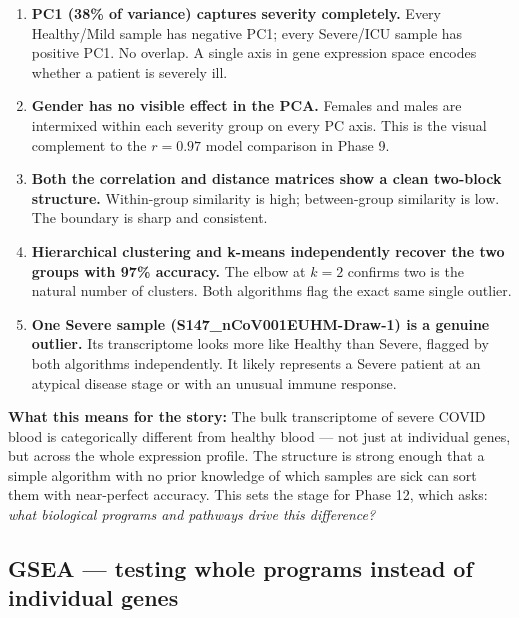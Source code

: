 \documentclass[11pt, a4paper]{article}
\begin{document}
\begin{enumerate}[nosep]
  \item \textbf{PC1 (38\% of variance) captures severity completely.}
        Every Healthy/Mild sample has negative PC1; every Severe/ICU sample has
        positive PC1. No overlap. A single axis in gene expression space encodes
        whether a patient is severely ill.

  \item \textbf{Gender has no visible effect in the PCA.}
        Females and males are intermixed within each severity group on every PC axis.
        This is the visual complement to the $r = 0.97$ model comparison in Phase 9.

  \item \textbf{Both the correlation and distance matrices show a clean two-block
        structure.} Within-group similarity is high; between-group similarity is low.
        The boundary is sharp and consistent.

  \item \textbf{Hierarchical clustering and k-means independently recover the two
        groups with 97\% accuracy.}
        The elbow at $k = 2$ confirms two is the natural number of clusters.
        Both algorithms flag the exact same single outlier.

  \item \textbf{One Severe sample (S147\_nCoV001EUHM-Draw-1) is a genuine outlier.}
        Its transcriptome looks more like Healthy than Severe, flagged by both
        algorithms independently. It likely represents a Severe patient at an
        atypical disease stage or with an unusual immune response.
\end{enumerate}

\textbf{What this means for the story:}
The bulk transcriptome of severe COVID blood is categorically different from
healthy blood — not just at individual genes, but across the whole expression
profile. The structure is strong enough that a simple algorithm with no prior
knowledge of which samples are sick can sort them with near-perfect accuracy.
This sets the stage for Phase 12, which asks:
\textit{what biological programs and pathways drive this difference?}

\subsection{GSEA — testing whole programs instead of individual genes}
\end{document}
